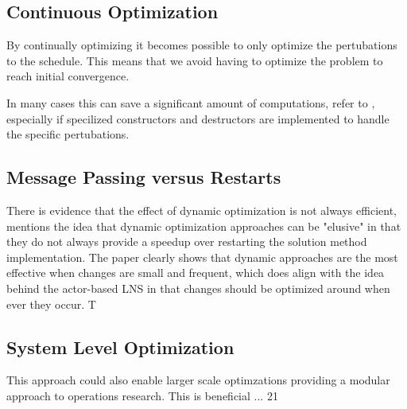 \documentclass[preprint,12pt,authoryear]{elsarticle}
\begin{document}
\subsection{Continuous Optimization}
By continually optimizing it becomes possible to only optimize the pertubations to the schedule. This means that we avoid having to optimize the problem to reach initial convergence.

In many cases this can save a significant amount of computations, refer to \cite{alza_bartlett_ceberio_mccall_2023}, especially if specilized constructors and destructors are implemented to handle the specific pertubations.

\subsection{Message Passing versus Restarts}
There is evidence that the effect of dynamic optimization is not always efficient, \cite{alza_bartlett_ceberio_mccall_2023} mentions the idea that dynamic optimization approaches can be "elusive" in that they do not always provide a speedup over restarting the solution method implementation. 
The paper clearly shows that dynamic approaches are the most effective when changes are small and frequent, which does align with the idea behind the actor-based LNS in that changes should be optimized around when ever they occur. T   


\subsection{System Level Optimization}
This approach could also enable larger scale optimzations providing a modular approach to operations research. This is beneficial ... 21







\end{document}
